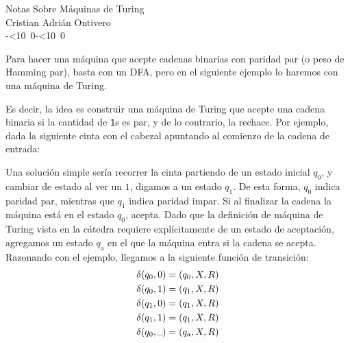 \documentclass{article}
\theoremstyle{definition}
\def\isodate{\leavevmode\hbox{\the\year-\twodigits\month-\twodigits\day}}
\def\twodigits#1{\ifnum#1<10 0\fi\the#1}
\begin{document}
\begin{center}
  {\LARGE Notas Sobre Máquinas de Turing}\\[.2cm]
  Cristian Adrián Ontivero \\[.05cm]%
  \isodate
\end{center}

Para hacer una máquina que acepte cadenas binarias con paridad par (o peso de
Hamming par), basta con un DFA, pero en el siguiente ejemplo lo haremos con
una máquina de Turing.

Es decir, la idea es construir una máquina de Turing que acepte una cadena
binaria si la cantidad de {\tt 1}s es par, y de lo contrario, la rechace. Por
ejemplo, dada la siguiente cinta con el cabezal apuntando al comienzo de la
cadena de entrada:

\begin{center}
\end{center}
Una solución simple sería recorrer la cinta partiendo de un estado inicial
\(q_0\), y cambiar de estado al ver un \(1\), digamos a un estado \(q_1\). De
esta forma, \(q_0\) indica paridad par, mientras que \(q_1\) indica paridad
impar. Si al finalizar la cadena la máquina está en el estado \(q_0\),
acepta. Dado que la definición de máquina de Turing vista en la cátedra
requiere explícitamente de un estado de aceptación, agregamos un estado
\(q_{\text{a}}\) en el que la máquina entra si la cadena se acepta. Razonando
con el ejemplo, llegamos a la siguiente función de transición:
 \begin{align*}
   \delta(q_0, 0) &= (q_0, X, R) \\
   \delta(q_0, 1) &= (q_1, X, R) \\
   \delta(q_1, 0) &= (q_1, X, R) \\
   \delta(q_1, 1) &= (q_1, X, R) \\
   \delta(q_0, \text{\textvisiblespace}) &= (q_{\text{a}}, X, R)
 \end{align*}
\end{document}
